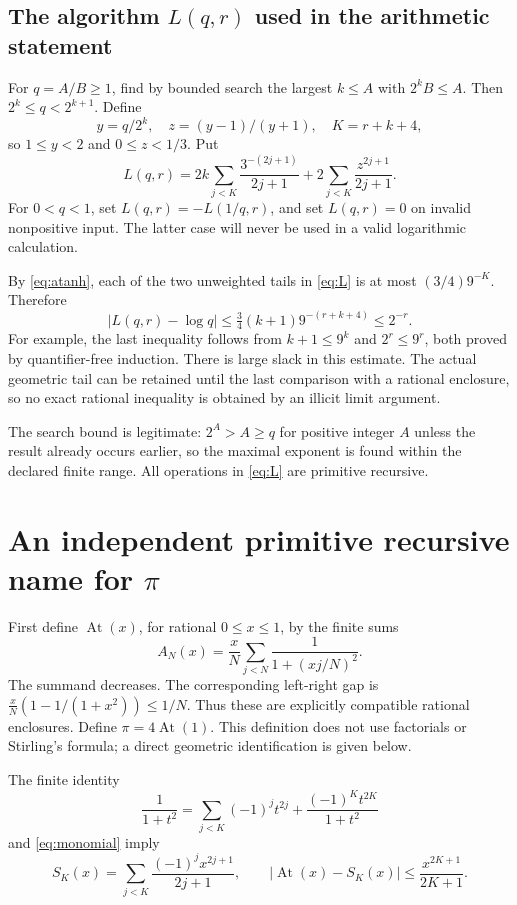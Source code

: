 \documentclass[11pt]{article}
\theoremstyle{definition}
\newcommand{\abs}[1]{\left|#1\right|}
\newcommand{\At}{\operatorname{At}}
\begin{document}
\subsection{The algorithm \texorpdfstring{$L(q,r)$}{L(q,r)} used in the arithmetic statement}

For $q=A/B\ge1$, find by bounded search the largest $k\le A$ with
$2^kB\le A$. Then $2^k\le q<2^{k+1}$. Define
\[
 y=q/2^k,\quad z=(y-1)/(y+1),\quad K=r+k+4,
\]
so $1\le y<2$ and $0\le z<1/3$. Put
\begin{equation}\label{eq:L}
 L(q,r)=2k\sum_{j<K}\frac{3^{-(2j+1)}}{2j+1}
       +2\sum_{j<K}\frac{z^{2j+1}}{2j+1}.
\end{equation}
For $0<q<1$, set $L(q,r)=-L(1/q,r)$, and set $L(q,r)=0$ on
invalid nonpositive input. The latter case will never be used in a valid
logarithmic calculation.

By \eqref{eq:atanh}, each of the two unweighted tails in
\eqref{eq:L} is at most $(3/4)9^{-K}$. Therefore
\begin{equation}\label{eq:Lerr}
 \abs{L(q,r)-\log q}
 \le\tfrac34(k+1)9^{-(r+k+4)}\le2^{-r}.
\end{equation}
For example, the last inequality follows from $k+1\le9^k$ and
$2^r\le9^r$, both proved by quantifier-free induction. There is large
slack in this estimate. The actual geometric tail can be retained until
the last comparison with a rational enclosure, so no exact rational
inequality is obtained by an illicit limit argument.

The search bound is legitimate: $2^A>A\ge q$ for positive integer $A$
unless the result already occurs earlier, so the maximal exponent is
found within the declared finite range. All operations in \eqref{eq:L}
are primitive recursive.

\section{An independent primitive recursive name for \texorpdfstring{$\pi$}{pi}}
\label{sec:pi}

First define $\At(x)$, for rational $0\le x\le1$, by the finite sums
\[
 A_N(x)=\frac{x}{N}\sum_{j<N}\frac1{1+(xj/N)^2}.
\]
The summand decreases. The corresponding left-right gap is
$\frac{x}{N}(1-1/(1+x^2))\le1/N$. Thus these are explicitly
compatible rational enclosures. Define $\pi=4\At(1)$. This definition
does not use factorials or Stirling's formula; a direct geometric
identification is given below.

The finite identity
\[
 \frac1{1+t^2}=\sum_{j<K}(-1)^jt^{2j}
                +\frac{(-1)^Kt^{2K}}{1+t^2}
\]
and \eqref{eq:monomial} imply
\begin{equation}\label{eq:atan}
 S_K(x)=\sum_{j<K}\frac{(-1)^jx^{2j+1}}{2j+1},\qquad
 \abs{\At(x)-S_K(x)}\le\frac{x^{2K+1}}{2K+1}.
\end{equation}
\end{document}

